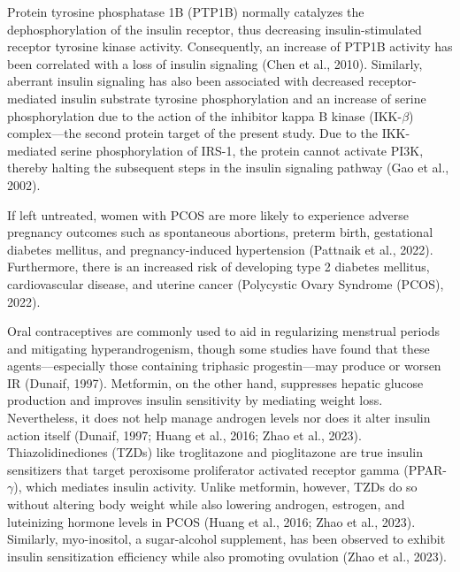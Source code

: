 Protein tyrosine phosphatase 1B (PTP1B) normally catalyzes the dephosphorylation of the insulin receptor, thus decreasing insulin-stimulated receptor tyrosine kinase activity. Consequently, an increase of PTP1B activity has been correlated with a loss of insulin signaling (Chen et al., 2010). Similarly, aberrant insulin signaling has also been associated with decreased receptor-mediated insulin substrate tyrosine phosphorylation and an increase of serine phosphorylation due to the action of the inhibitor kappa B kinase (IKK-$\beta$) complex––the second protein target of the present study. Due to the IKK-mediated serine phosphorylation of IRS-1, the protein cannot activate PI3K, thereby halting the subsequent steps in the insulin signaling pathway (Gao et al., 2002).

If left untreated, women with PCOS are more likely to experience adverse pregnancy outcomes such as spontaneous abortions, preterm birth, gestational diabetes mellitus, and pregnancy-induced hypertension (Pattnaik et al., 2022). Furthermore, there is an increased risk of developing type 2 diabetes mellitus, cardiovascular disease, and uterine cancer (Polycystic Ovary Syndrome (PCOS), 2022). 

Oral contraceptives are commonly used to aid in regularizing menstrual periods and mitigating hyperandrogenism, though some studies have found that these agents––especially those containing triphasic progestin––may produce or worsen IR (Dunaif, 1997). Metformin, on the other hand, suppresses hepatic glucose production and improves insulin sensitivity by mediating weight loss. Nevertheless, it does not help manage androgen levels nor does it alter insulin action itself (Dunaif, 1997; Huang et al., 2016; Zhao et al.,  2023). Thiazolidinediones (TZDs) like troglitazone and pioglitazone are true insulin sensitizers that target peroxisome proliferator activated receptor gamma (PPAR-$\gamma$), which mediates insulin activity. Unlike metformin, however, TZDs do so without altering body weight while also lowering androgen, estrogen, and luteinizing hormone levels in PCOS (Huang et al., 2016; Zhao et al., 2023). Similarly, myo-inositol, a sugar-alcohol supplement, has been observed to exhibit insulin sensitization efficiency while also promoting ovulation (Zhao et al.,  2023). 

